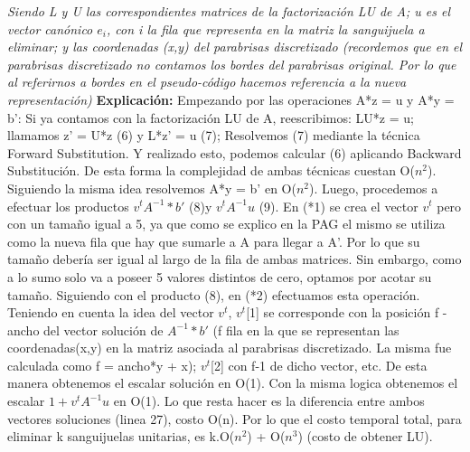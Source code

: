 \begin{itemize}
\begin{algorithm}[H]
\begin{algorithmic}[1]
\end{algorithmic}
\end{algorithm}
\textit{Siendo L y U las correspondientes matrices de la factorizaci\'on LU de A; u es el vector can\'onico $e_i$, con i la fila que representa en la matriz la sanguijuela a eliminar; y las coordenadas (x,y) del parabrisas discretizado (recordemos que en el parabrisas discretizado no contamos los bordes del parabrisas original. Por lo que al referirnos a bordes en el pseudo-c\'odigo hacemos referencia a la nueva representaci\'on)}\newline\newline
 \textbf{Explicación:}\newline  
Empezando por las operaciones A*z = u y A*y = b': \newline
Si ya contamos con la factorización LU de A, reescribimos:\newline
LU*z = u; \newline
llamamos z' = U*z (6) y L*z' = u (7);\newline
Resolvemos (7) mediante la técnica Forward Substitution. Y realizado esto, podemos calcular (6) aplicando Backward Substitución. De esta forma la complejidad de ambas técnicas cuestan O($n^2$). Siguiendo la misma idea resolvemos 
A*y = b' en O($n^2$). Luego, procedemos a efectuar los productos $v^t A^{-1}*b'$ (8)y $v^t A^{-1}u$ (9). En (*1) se crea el vector $v^t$ pero con un tamaño igual a 5, ya que como se explico en la PAG el mismo  se utiliza como la nueva fila que hay que sumarle a A para llegar a A'. Por lo que su tamaño debería ser igual al largo de la fila de ambas matrices. Sin embargo, como a lo sumo solo va a poseer 5 valores distintos de cero, optamos por acotar su tamaño. Siguiendo con el producto (8), en (*2) efectuamos esta operación. Teniendo en cuenta la idea del vector $v^t$, $v^t$[1] se corresponde con la posición f - ancho del vector solución de $A^{-1}*b'$ (f fila en la que se representan las coordenadas(x,y) en la matriz asociada al parabrisas discretizado. La misma fue calculada como f = ancho*y + x); $v^t$[2] con f-1 de dicho vector, etc. De esta manera obtenemos el escalar solución en O(1). Con la misma logica obtenemos el escalar $1+v^t A^{-1}u$ en O(1). Lo que resta hacer es la diferencia entre ambos vectores soluciones (linea 27), costo O(n). Por lo que el costo temporal total, para eliminar k sanguijuelas unitarias, es k.O($n^2$) + O($n^3$) (costo de obtener LU).\newline\newline







\end{itemize}
